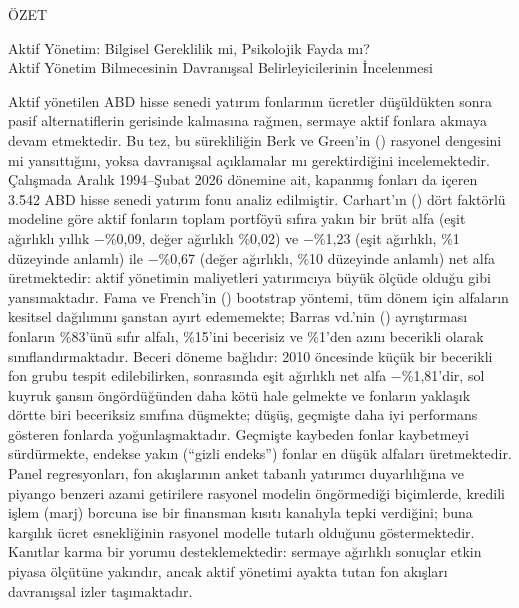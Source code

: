\documentclass[12pt, oneside]{report}
\begin{document}
\clearpage

\thispagestyle{plain}
\begin{center}
ÖZET

Aktif Yönetim: Bilgisel Gereklilik mi, Psikolojik Fayda mı?\\
Aktif Yönetim Bilmecesinin Davranışsal Belirleyicilerinin İncelenmesi

\vspace{12pt}
\end{center}

\noindent Aktif yönetilen ABD hisse senedi yatırım fonlarının ücretler düşüldükten sonra pasif alternatiflerin gerisinde kalmasına rağmen, sermaye aktif fonlara akmaya devam etmektedir. Bu tez, bu sürekliliğin Berk ve Green'in (\citeyear{BerkGreen2004}) rasyonel dengesini mi yansıttığını, yoksa davranışsal açıklamalar mı gerektirdiğini incelemektedir. Çalışmada Aralık 1994--Şubat 2026 dönemine ait, kapanmış fonları da içeren 3.542 ABD hisse senedi yatırım fonu analiz edilmiştir. Carhart'ın (\citeyear{Carhart1997}) dört faktörlü modeline göre aktif fonların toplam portföyü sıfıra yakın bir brüt alfa (eşit ağırlıklı yıllık $-$\%0,09, değer ağırlıklı \%0,02) ve $-$\%1,23 (eşit ağırlıklı, \%1 düzeyinde anlamlı) ile $-$\%0,67 (değer ağırlıklı, \%10 düzeyinde anlamlı) net alfa üretmektedir: aktif yönetimin maliyetleri yatırımcıya büyük ölçüde olduğu gibi yansımaktadır. Fama ve French'in (\citeyear{FamaFrench2010}) bootstrap yöntemi, tüm dönem için alfaların kesitsel dağılımını şanstan ayırt edememekte; Barras vd.'nin (\citeyear{BarrasScailletWermers2010}) ayrıştırması fonların \%83'ünü sıfır alfalı, \%15'ini becerisiz ve \%1'den azını becerikli olarak sınıflandırmaktadır. Beceri döneme bağlıdır: 2010 öncesinde küçük bir becerikli fon grubu tespit edilebilirken, sonrasında eşit ağırlıklı net alfa $-$\%1,81'dir, sol kuyruk şansın öngördüğünden daha kötü hale gelmekte ve fonların yaklaşık dörtte biri beceriksiz sınıfına düşmekte; düşüş, geçmişte daha iyi performans gösteren fonlarda yoğunlaşmaktadır. Geçmişte kaybeden fonlar kaybetmeyi sürdürmekte, endekse yakın (``gizli endeks'') fonlar en düşük alfaları üretmektedir. Panel regresyonları, fon akışlarının anket tabanlı yatırımcı duyarlılığına ve piyango benzeri azami getirilere rasyonel modelin öngörmediği biçimlerde, kredili işlem (marj) borcuna ise bir finansman kısıtı kanalıyla tepki verdiğini; buna karşılık ücret esnekliğinin rasyonel modelle tutarlı olduğunu göstermektedir. Kanıtlar karma bir yorumu desteklemektedir: sermaye ağırlıklı sonuçlar etkin piyasa ölçütüne yakındır, ancak aktif yönetimi ayakta tutan fon akışları davranışsal izler taşımaktadır.
\end{document}
